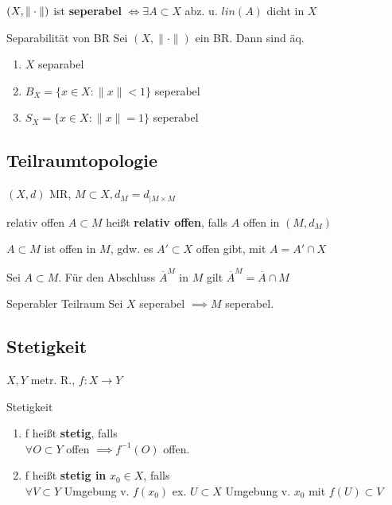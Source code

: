 \begin{lemma}
  $(X, \|\cdot\|)$ ist \textbf{seperabel} $\Leftrightarrow
  \exists A \subset X$ abz. u. $lin(A)$ dicht in \(X\)
\end{lemma}

\begin{satz}{Separabilität von BR}
  Sei \((X, \|\cdot\|)\) ein BR. Dann sind äq.
  \begin{enumerate}[label=(\roman*)]
    \item \(X\) separabel
    \item \(B_X=\{x\in X: \|x\| < 1\}\) seperabel
    \item \(S_X=\{x\in X: \|x\| = 1\}\) seperabel
  \end{enumerate}
\end{satz}



\subsection{Teilraumtopologie}
\((X,d)\) MR, \(M\subset X, d_M = d_{|M\times M}\)\\

\begin{definition}{relativ offen}
  $A \subset M$ heißt \textbf{relativ offen}, falls $A$ offen in $(M,d_M)$
\end{definition}

\begin{lemma}
  \(A\subset M\) ist offen in \(M\), gdw. es \(A'\subset X\) offen gibt, mit
  \(A = A'\cap X\)
\end{lemma}

\begin{korrolar}
  Sei \(A \subset M\). Für den Abschluss \(\overline{A}^M\) in \(M\) gilt
  \(\overline{A}^M = \overline{A}\cap M\)
\end{korrolar}

\begin{satz}{Seperabler Teilraum}
  Sei \(X\) seperabel \(\implies M\) seperabel.
\end{satz}

\subsection{Stetigkeit}

$X,Y$ metr. R., $f:X\to Y$\\
\begin{definition}{Stetigkeit}
  \begin{enumerate}[label = (\arabic*)]
    \item  f heißt \textbf{stetig}, falls\\
      $\forall O \subset Y$ offen $\implies f^{-1}(O)$ offen.
    \item f heißt \textbf{stetig in} $x_0 \in X$, falls\\
      $\forall V \subset Y$ Umgebung v. $f(x_0)$ ex.
      $U \subset X$ Umgebung v. $x_0$ mit $f(U) \subset V$
  \end{enumerate}
\end{definition}


